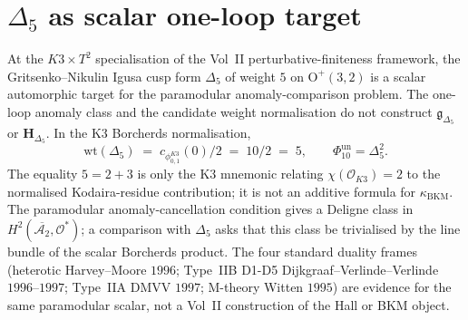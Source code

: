 \section{$\Delta_5$ as scalar one-loop target}
\label{sec:thqg-pf-supplement}

\begin{remark}
\label{rem:thqg-pf-delta5-output}
At the $K3 \times T^2$ specialisation of the Vol~II perturbative-finiteness
framework, the Gritsenko--Nikulin Igusa cusp form $\Delta_5$ of weight
$5$ on $\mathrm{O}^+(3,2)$ is a scalar automorphic target for the
paramodular anomaly-comparison problem.  The one-loop anomaly class and
the candidate weight normalisation do not construct
$\mathfrak g_{\Delta_5}$ or $\mathbf H_{\Delta_5}$.  In the K3
Borcherds normalisation,
\[
 \mathrm{wt}(\Delta_5)
 \;=\;
 c_{\phi_{0,1}^{K3}}(0)/2
 \;=\;
 10/2
 \;=\;
 5,
 \qquad
 \Phi_{10}^{\mathrm{un}}=\Delta_5^2 .
\]
The equality $5=2+3$ is only the K3 mnemonic relating
\(\chi(\mathcal O_{K3})=2\) to the normalised Kodaira-residue
contribution; it is not an additive formula for
\(\kappa_{\mathrm{BKM}}\).  The paramodular anomaly-cancellation condition gives a
Deligne class in $H^2(\overline{\mathcal{A}_2}, \mathcal{O}^*)$; a
comparison with $\Delta_5$ asks that this class be trivialised by the
line bundle of the scalar Borcherds product.  The four standard duality
frames (heterotic Harvey--Moore $1996$; Type~IIB D1-D5
Dijkgraaf--Verlinde--Verlinde $1996$--$1997$; Type~IIA DMVV $1997$;
M-theory Witten $1995$) are evidence for the same paramodular scalar,
not a Vol~II construction of the Hall or BKM object.
\end{remark}

